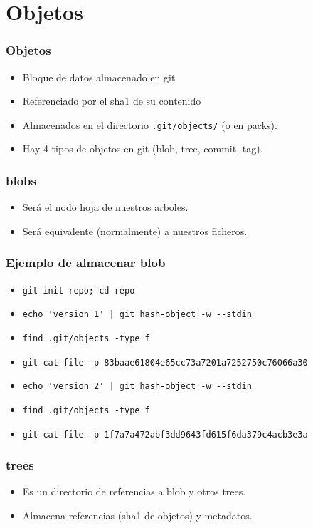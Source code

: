 \documentclass[10pt]{beamer}
\begin{document}
  \section*{Objetos}

  \begin{frame}[containsverbatim]
    \frametitle{Objetos}
    \begin{itemize}
        \item Bloque de datos almacenado en git
        \item Referenciado por el sha1 de su contenido
        \item Almacenados en el directorio \verb$.git/objects/$ (o en packs).
        \item Hay 4 tipos de objetos en git (blob, tree, commit, tag).
    \end{itemize}
  \end{frame}

  \begin{frame}[containsverbatim]
    \frametitle{blobs}
    \begin{itemize}
        \item Será el nodo hoja de nuestros arboles.
        \item Será equivalente (normalmente) a nuestros ficheros.
    \end{itemize}
  \end{frame}

  \begin{frame}[containsverbatim]
    \frametitle{Ejemplo de almacenar blob}
    \begin{itemize}
        \item \verb$git init repo; cd repo$
        \item \verb$echo 'version 1' | git hash-object -w --stdin$
        \item \verb$find .git/objects -type f$
        \item \verb$git cat-file -p 83baae61804e65cc73a7201a7252750c76066a30$
        \item \verb$echo 'version 2' | git hash-object -w --stdin$
        \item \verb$find .git/objects -type f$
        \item \verb$git cat-file -p 1f7a7a472abf3dd9643fd615f6da379c4acb3e3a$
    \end{itemize}
  \end{frame}

  \begin{frame}[containsverbatim]
    \frametitle{trees}
    \begin{itemize}
        \item Es un directorio de referencias a blob y otros trees.
        \item Almacena referencias (sha1 de objetos) y metadatos.
    \end{itemize}
  \end{frame}
\end{document}
